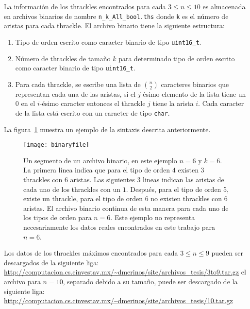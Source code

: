   La información de los thrackles encontrados para cada $3\leq n \leq 10$ es
  almacenada en archivos binarios de nombre \texttt{n\_k\_All\_bool.ths}
  donde \texttt{k} es el número de aristas para cada thrackle. El archivo binario
  tiene la siguiente estructura:
  \begin{enumerate}
    \item Tipo de orden escrito como caracter binario de tipo \texttt{uint16\_t}.
    \item Número de thrackles de tamaño $k$ para determinado tipo de orden
    escrito como caracter binario de tipo \texttt{uint16\_t}.
    \item Para cada thrackle, se escribe una lista de $\binom{n}{2}$ caracteres
    binarios que representan cada una de las aristas, si el $j$-ésimo elemento de
    la lista tiene un $0$ en el $i$-ésimo caracter entonces el thrackle $j$
    tiene la arista $i$. Cada caracter de la lista está escrito con un caracter
    de tipo \texttt{char}.
  \end{enumerate}

  La figura~\ref{fig:binaryfile} muestra un ejemplo de la sintaxis
  descrita anteriormente.
  \begin{figure}[htpb]
    \centering
    \texttt{[image: binaryfile]}
    \caption{Un segmento de un archivo binario, en este ejemplo $n=6$ y $k=6$.
    La primera línea indica que para el tipo de orden $4$ existen $3$ thrackles
    con $6$ aristas. Las siguientes 3 lineas indican las aristas de cada uno
    de los thrackles con un $1$. Después, para el tipo de orden 5, existe un
    thrackle, para el tipo de orden 6 no existen thrackles con 6 aristas. El
    archivo binario continua de esta manera para cada uno de los tipos de orden
    para $n=6$. Este ejemplo no representa necesariamente los datos reales
    encontrados en este trabajo para $n=6$.}
    \label{fig:binaryfile}
  \end{figure}

  Los datos de los thrackles máximos encontrados para cada $ 3\leq n \leq 9$
  pueden ser descargados de la siguiente liga:
  \url{http://computacion.cs.cinvestav.mx/~dmerinos/site/archivos_tesis/3to9.tar.gz}
  el archivo para $n=10$, separado debido a su tamaño,
   puede ser descargado de la siguiente liga:
  \url{http://computacion.cs.cinvestav.mx/~dmerinos/site/archivos_tesis/10.tar.gz}

